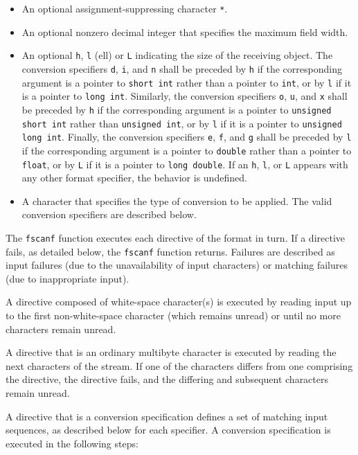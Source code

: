 \begin{itemize}
	\item An optional assignment-suppressing character \texttt{*}.
	\item An optional nonzero decimal integer that specifies the maximum field
width.
	\item An optional \texttt{h}, \texttt{l} (ell) or \texttt{L} indicating the
size of the receiving object. The conversion specifiers \texttt{d}, \texttt{i},
and \texttt{n} shall be preceded by \texttt{h} if the corresponding argument is
a pointer to \texttt{short int} rather than a pointer to \texttt{int}, or by
\texttt{l} if it is a pointer to \texttt{long int}. Similarly, the conversion
specifiers \texttt{o}, \texttt{u}, and \texttt{x} shall be preceded by
\texttt{h} if the corresponding argument is a pointer to \texttt{unsigned short
int} rather than \texttt{unsigned int}, or by \texttt{l} if it is a pointer to
\texttt{unsigned long int}. Finally, the conversion specifiers \texttt{e},
\texttt{f}, and \texttt{g} shall be preceded by \texttt{l} if the corresponding
argument is a pointer to \texttt{double} rather than a pointer to
\texttt{float}, or by \texttt{L} if it is a pointer to \texttt{long double}. If
an \texttt{h}, \texttt{l}, or \texttt{L} appears with any other format
specifier, the behavior is undefined.
	\item A character that specifies the type of conversion to be applied. The
valid conversion specifiers are described below.
\end{itemize}

The \texttt{fscanf} function executes each directive of the format in turn. If
a directive fails, as detailed below, the \texttt{fscanf} function returns.
Failures are described as input failures (due to the unavailability of input
characters) or matching failures (due to inappropriate input).

A directive composed of white-space character(s) is executed by reading input
up to the first non-white-space character (which remains unread) or until no
more characters remain unread.

A directive that is an ordinary multibyte character is executed by reading the
next characters of the stream. If one of the characters differs from one
comprising the directive, the directive fails, and the differing and subsequent
characters remain unread.

A directive that is a conversion specification defines a set of matching input
sequences, as described below for each specifier. A conversion specification is
executed in the following steps:

